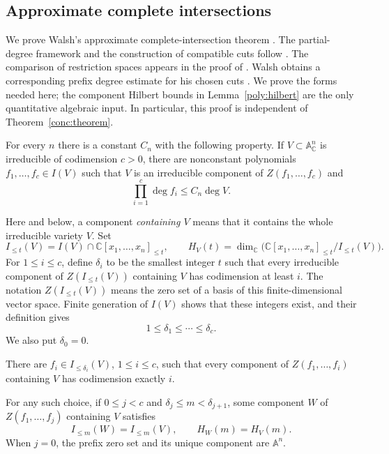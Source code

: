 \subsection{Approximate complete intersections}
\label{aci:section}

We prove Walsh's approximate complete-intersection theorem
\cite[Theorem~1.3]{walsh2020}. The partial-degree framework and the
construction of compatible cuts follow
\cite[Definition~2.2 and Lemma~5.3]{walsh2020}.
The comparison of restriction spaces appears in the proof of
\cite[Lemma~3.5]{walsh2020}. Walsh obtains a corresponding prefix
degree estimate for his chosen cuts
\cite[Theorem~5.5]{walsh2020}.
We prove the forms needed here; the component Hilbert bounds in
Lemma~\ref{poly:hilbert} are the only quantitative algebraic input.
In particular, this proof is independent
of Theorem~\ref{conc:theorem}.

\begin{theorem}
\label{aci:theorem}
\label{conc:walsh}
For every $n$ there is a constant $C_n$ with the following property.
If $V\subset\mathbb A^n_{\mathbb C}$ is irreducible of codimension
$c>0$, there are nonconstant polynomials $f_1,\ldots,f_c\in I(V)$ such
that $V$ is an irreducible component of $Z(f_1,\ldots,f_c)$ and
\[
 \prod_{i=1}^c\deg f_i\le C_n\deg V.
\]
\end{theorem}

Here and below, a component \emph{containing $V$} means that it contains
the whole irreducible variety $V$.  Set
\[
 I_{\le t}(V)=I(V)\cap\mathbb C[x_1,\ldots,x_n]_{\le t},
 \qquad
 H_V(t)=\dim_{\mathbb C}
 \bigl(\mathbb C[x_1,\ldots,x_n]_{\le t}/I_{\le t}(V)\bigr).
\]
For $1\le i\le c$, define $\delta_i$ to be the smallest integer $t$
such that every irreducible component of $Z(I_{\le t}(V))$ containing
$V$ has codimension at least $i$.  The notation $Z(I_{\le t}(V))$
means the zero set of a basis of this finite-dimensional vector space.
Finite generation of $I(V)$ shows that these integers exist, and their
definition gives
\begin{equation}
 1\le\delta_1\le\cdots\le\delta_c.
 \label{aci:partial-degrees}
\end{equation}
We also put $\delta_0=0$.

\begin{lemma}
\label{aci:cuts}
There are $f_i\in I_{\le\delta_i}(V)$, $1\le i\le c$, such that
every component of $Z(f_1,\ldots,f_i)$ containing $V$ has codimension
exactly $i$.

For any such choice, if $0\le j<c$ and
$\delta_j\le m<\delta_{j+1}$, some component $W$ of
$Z(f_1,\ldots,f_j)$ containing $V$ satisfies
\begin{equation}
 I_{\le m}(W)=I_{\le m}(V),\qquad H_W(m)=H_V(m).
 \label{aci:shared-rank}
\end{equation}
When $j=0$, the prefix zero set and its unique component are
$\mathbb A^n$.
\end{lemma}

